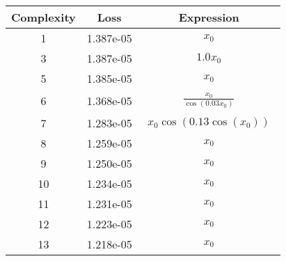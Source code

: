 \begin{center}
        \begin{tabular}{|c|c|c|}
        \hline
        Complexity & Loss & Expression \\
        \hline
        1 & 1.387e-05 & $\begin{aligned}x_{0}\end{aligned}$\\ \hline3 & 1.387e-05 & $\begin{aligned}1.0 x_{0}\end{aligned}$\\ \hline5 & 1.385e-05 & $\begin{aligned}x_{0}\end{aligned}$\\ \hline6 & 1.368e-05 & $\begin{aligned}\frac{x_{0}}{\cos{\left(0.03 x_{0} \right)}}\end{aligned}$\\ \hline7 & 1.283e-05 & $\begin{aligned}x_{0} \cos{\left(0.13 \cos{\left(x_{0} \right)} \right)}\end{aligned}$\\ \hline8 & 1.259e-05 & $\begin{aligned}x_{0}\end{aligned}$\\ \hline9 & 1.250e-05 & $\begin{aligned}x_{0}\end{aligned}$\\ \hline10 & 1.234e-05 & $\begin{aligned}x_{0}\end{aligned}$\\ \hline11 & 1.231e-05 & $\begin{aligned}x_{0}\end{aligned}$\\ \hline12 & 1.223e-05 & $\begin{aligned}x_{0}\end{aligned}$\\ \hline13 & 1.218e-05 & $\begin{aligned}x_{0}\end{aligned}$\\ \hline\end{tabular}
        \end{center}
        